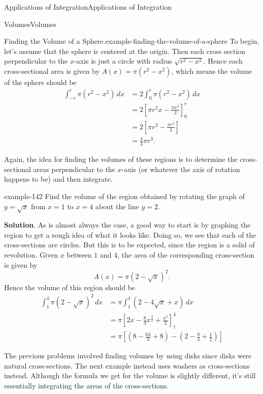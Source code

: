 \documentclass[10pt,]{book}
\numberwithin{equation}{section}
\newcommand{\amp}{&}
\begin{document}
\begin{chapterptx}{Applications of Integration}{}{Applications of Integration}{}{}
\begin{sectionptx}{Volumes}{}{Volumes}{}{}
\begin{example}{Finding the Volume of a Sphere.}{example-finding-the-volume-of-a-sphere}
\hypertarget{p-631}{}%
To begin, let's assume that the sphere is centered at the origin. Then each cross section perpendicular to the \(x\)-axis is just a circle with radius \(\sqrt{r^{2} - x^{2}}\). Hence each cross-sectional area is given by \(A(x) = \pi(r^{2} - x^{2})\), which means the volume of the sphere should be%
\begin{align*}
\int_{-r}^{r}\pi(r^{2} - x^{2})\,dx \amp= 2\int_{0}^{r}\pi(r^{2} - x^{2})\,dx\\
\amp= 2\left[\pi r^{2}x - \frac{\pi x^{3}}{3}\right]_{0}^{r}\\
\amp= 2\left[\pi r^{3} - \frac{\pi r^{3}}{3}\right]\\
\amp= \frac{4}{3}\pi r^{3}.
\end{align*}
%
\end{example}
\hypertarget{p-632}{}%
Again, the idea for finding the volumes of these regions is to determine the cross-sectional areas perpendicular to the \(x\)-axis (or whatever the axis of rotation happens to be) and then integrate.%
\begin{example}{}{example-142}%
\hypertarget{p-633}{}%
Find the volume of the region obtained by rotating the graph of \(y = \sqrt{x}\) from \(x = 1\) to \(x = 4\) about the line \(y = 2\).%
\par\smallskip%
\noindent\textbf{Solution}.\hypertarget{solution-138}{}\quad%
\hypertarget{p-634}{}%
As is almost always the case, a good way to start is by graphing the region to get a rough idea of what it looks like. Doing so, we see that each of the cross-sections are circles. But this is to be expected, since the region is a solid of revolution. Given \(x\) between \(1\) and \(4\), the area of the corresponding cross-section is given by%
\begin{equation*}
A(x) = \pi(2 - \sqrt{x})^{2}.
\end{equation*}
Hence the volume of this region should be%
\begin{align*}
\int_{1}^{4}\pi(2 - \sqrt{x})^{2}\,dx \amp= \pi\int_{1}^{4}(2 - 4\sqrt{x} + x)\,dx\\
\amp= \pi\left[2x - \frac{8}{3}x^{\frac{3}{2}} + \frac{x^{2}}{2}\right]_{1}^{4}\\
\amp= \pi\left[\left(8 - \frac{64}{3} + 8\right) - \left(2 - \frac{8}{3} + \frac{1}{2}\right)\right]
\end{align*}
%
\end{example}
\hypertarget{p-635}{}%
The previous problems involved finding volumes by using disks since disks were natural cross-sections. The next example instead uses washers as cross-sections instead. Although the formula we get for the volume is slightly different, it's still essentially integrating the areas of the cross-sections.%

\end{sectionptx}
\end{chapterptx}
\end{document}
